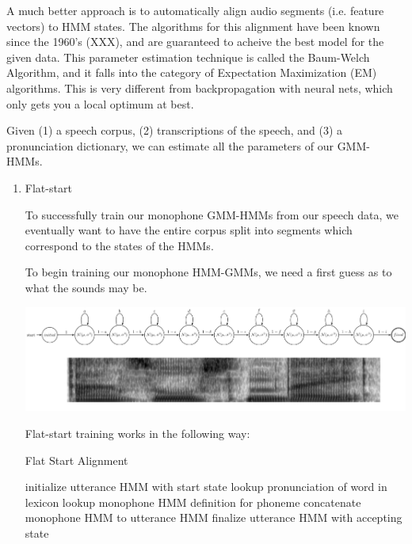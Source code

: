 \documentclass[10pt,a4paper]{article}
\begin{document}
A much better approach is to automatically align audio segments (i.e. feature vectors) to HMM states. The algorithms for this alignment have been known since the 1960's (XXX), and are guaranteed to acheive the best model for the given data. This parameter estimation technique is called the Baum-Welch Algorithm, and it falls into the category of Expectation Maximization (EM) algorithms. This is very different from backpropagation with neural nets, which only gets you a local optimum at best.

Given (1) a speech corpus, (2) transcriptions of the speech, and (3) a pronunciation dictionary, we can estimate all the parameters of our GMM-HMMs.

\begin{enumerate}
\item Flat-start 
  
  To successfully train our monophone GMM-HMMs from our speech data, we eventually want to have the entire corpus split into segments which correspond to the states of the HMMs.
  
  To begin training our monophone HMM-GMMs, we need a first guess as to what the sounds may be.
  
  \begin{center}
    \includegraphics[width=1.0\textwidth,keepaspectratio]{figs/flat-start.png}
  \end{center}
  
  Flat-start training works in the following way:
  
  
  \begin{algorithm}
    \caption{Flat Start Alignment}
    \begin{algorithmic}[1]
      \State initialize utterance HMM with start state
      \State lookup pronunciation of word in lexicon
      \State lookup monophone HMM definition for phoneme
      \State concatenate monophone HMM to utterance HMM
      \EndFor
      \EndFor
      \State finalize utterance HMM with accepting state
      \EndFor
      \EndProcedure
      

\end{algorithmic}
\end{algorithm}
\end{enumerate}
\end{document}
